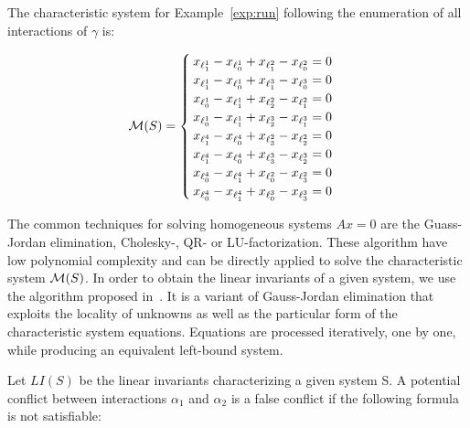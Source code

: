 \begin{example}
  The characteristic system for Example~\ref{exp:run} following the enumeration of all 
  interactions of $\gamma$ is:

  \[\mathcal{M}(S)=\begin{cases}
    x_{\ell_1^1}-x_{\ell_0^1}+x_{\ell_1^2}-x_{\ell_0^2}=0\\ 
    x_{\ell_1^1}-x_{\ell_0^1}+x_{\ell_1^3}-x_{\ell_0^3}=0\\ 
    x_{\ell_0^1}-x_{\ell_1^1}+x_{\ell_2^2}-x_{\ell_1^2}=0\\ 
    x_{\ell_0^1}-x_{\ell_1^1}+x_{\ell_2^3}-x_{\ell_1^3}=0\\ 
    x_{\ell_1^4}-x_{\ell_0^4}+x_{\ell_3^2}-x_{\ell_2^2}=0\\ 
    x_{\ell_1^4}-x_{\ell_0^4}+x_{\ell_3^3}-x_{\ell_2^3}=0\\ 
    x_{\ell_0^4}-x_{\ell_1^4}+x_{\ell_0^2}-x_{\ell_3^2}=0\\ 
    x_{\ell_0^4}-x_{\ell_1^4}+x_{\ell_0^3}-x_{\ell_3^3}=0\\ 
  
  
  \end{cases}\]

\end{example}

The common techniques for solving homogeneous systems $Ax=0$ are the Guass-Jordan elimination,
Cholesky-, QR- or LU-factorization. These algorithm have low polynomial complexity and
can be directly applied to solve the characteristic system $\mathcal{M}(S)$.
In order to obtain the linear invariants of a given system, we use the algorithm 
proposed in~\cite{inv-lin}. It is a variant of Gauss-Jordan elimination that exploits 
the locality of unknowns as well as the particular form of the characteristic system equations. 
Equations are processed iteratively, one by one, while producing an equivalent left-bound system.

Let $LI(S)$ be the linear invariants characterizing a given system S.
A potential conflict between interactions $\alpha_1$ and $\alpha_2$ is a false conflict if the 
following formula is not satisfiable:

